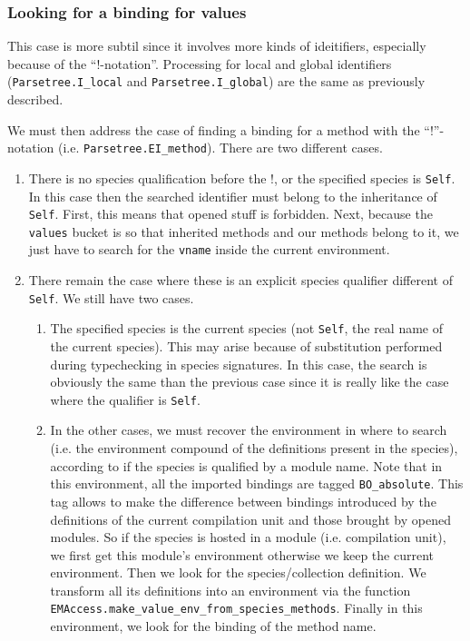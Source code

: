 \subsubsection{Looking for a binding for values}
This case is more subtil since it involves more kinds of ideitifiers,
especially because of the ``!-notation''. Processing for local and
global identifiers ({\tt Parsetree.I\_local} and {\tt Parsetree.I\_global})
are the same as previously described.

We must then address the case of finding a binding for a method with
the ``!''-notation (i.e. {\tt Parsetree.EI\_method}). There are two
different cases.
\begin{enumerate}
\item There is no species qualification before the !, or the specified
  species is {\tt Self}. In this case then the searched identifier
  must belong to the inheritance of {\tt Self}. First, this means that
  opened stuff is forbidden. Next, because the {\tt values} bucket is so
  that inherited methods and our methods belong to it, we just have to
  search for the {\tt vname} inside the current environment.
\item There remain the case where these is an explicit species
  qualifier different of {\tt Self}. We still have two cases.
  \begin{enumerate}
  \item The specified species is the current species (not {\tt Self},
    the real name of the current species). This may arise because of
    substitution performed during typechecking in species
    signatures. In this case, the search is obviously the same than
    the previous case since it is really like the case where the
    qualifier is {\tt Self}.
  \item In the other cases, we must recover the environment in where
    to search (i.e. the environment compound of the definitions present
    in the species), according to if the species is qualified by a
    module name. Note that in this environment, all the imported
    bindings are tagged {\tt BO\_absolute}. This tag allows to make the
    difference between bindings introduced by the definitions of the
    current compilation unit and those brought by opened modules.
    So if the species is hosted in a module (i.e. compilation unit),
    we first get this module's environment otherwise we keep the
    current environment. Then we look for the species/collection
    definition. We transform all its definitions into an environment
    via the function {\tt EMAccess.make\_value\_env\_from\_species\_methods}.
    Finally in this environment, we look for the binding of the
    method name.


\end{enumerate}
\end{enumerate}
